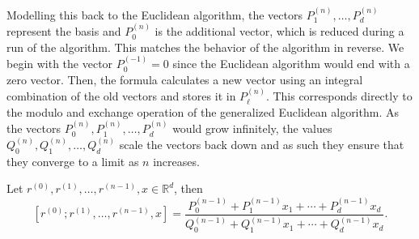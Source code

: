 Modelling this back to the Euclidean algorithm,
the vectors $P_1^{(n)}, …, P_d^{(n)}$ represent the basis and $P_0^{(n)}$ is
the additional vector, which is reduced during a run of the algorithm.
This matches the behavior of the algorithm in reverse.
We begin with the vector $P_0^{(-1)} = 0$ since the Euclidean algorithm
would end with a zero vector.
Then, the formula calculates a new vector using an integral combination of the
old vectors and stores it in $P_ℓ^{(n)}$.
This corresponds directly to the modulo and exchange operation of the
generalized Euclidean algorithm.
As the vectors $P_0^{(n)}, P_1^{(n)}, …, P_d^{(n)}$ would grow infinitely, the
values $Q_0^{(n)}, Q_1^{(n)}, …, Q_d^{(n)}$ scale the vectors back down and as
such they ensure that they converge to a limit as $n$ increases.

\begin{lemma}
  \label{lem:mdcf-wallis}
  Let $r^{(0)}, r^{(1)}, …, r^{(n-1)}, x ∈ ℝ^d$, then
  \[
    [r^{(0)}; r^{(1)}, …, r^{(n-1)}, x]
    = \frac{P_0^{(n-1)} + P_1^{(n-1)} x_1 + ⋯ + P_d^{(n-1)} x_d}{Q_0^{(n-1)} + Q_1^{(n-1)} x_1 + ⋯ + Q_d^{(n-1)} x_d}.
  \]
\end{lemma}

